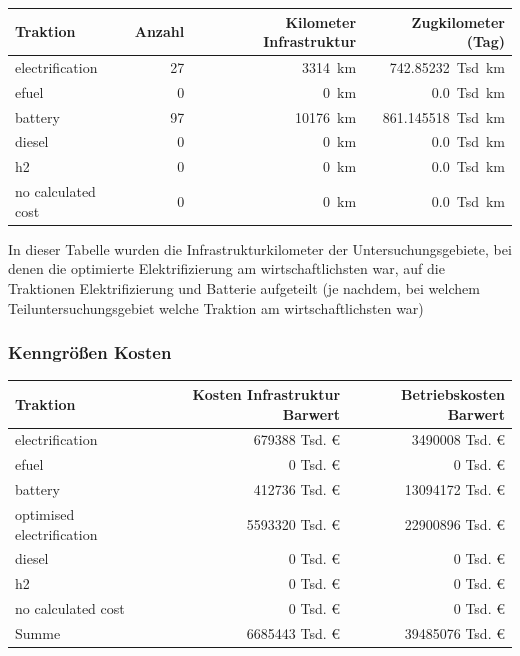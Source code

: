 \begin{center}
	\begin{tabularx}{\textwidth}{X | r | r | r} Traktion & Anzahl & Kilometer Infrastruktur & Zugkilometer (Tag) \\
	\hline
            electrification & \num{27} &  \SI{3314}{\km} & \SI{742.85232}{Tsd. \km}\\
            efuel & \num{0} &  \SI{0}{\km} & \SI{0.0}{Tsd. \km}\\
            battery & \num{97} &  \SI{10176}{\km} & \SI{861.145518}{Tsd. \km}\\
            diesel & \num{0} &  \SI{0}{\km} & \SI{0.0}{Tsd. \km}\\
            h2 & \num{0} &  \SI{0}{\km} & \SI{0.0}{Tsd. \km}\\
            no calculated cost & \num{0} &  \SI{0}{\km} & \SI{0.0}{Tsd. \km}\\
    	\end{tabularx}
\end{center}
In dieser Tabelle wurden die Infrastrukturkilometer der Untersuchungsgebiete, bei denen die optimierte Elektrifizierung am wirtschaftlichsten war, auf die Traktionen Elektrifizierung und Batterie aufgeteilt (je nachdem, bei welchem Teiluntersuchungsgebiet welche Traktion am wirtschaftlichsten war)

\subsubsection{Kenngrößen Kosten}

\begin{center}
	\begin{tabularx}{\textwidth}{X | r | r} Traktion & Kosten Infrastruktur Barwert & Betriebskosten Barwert\\
	\hline
            electrification & \num{679388} Tsd. € &  \num{3490008} Tsd. €\\
            efuel & \num{0} Tsd. € &  \num{0} Tsd. €\\
            battery & \num{412736} Tsd. € &  \num{13094172} Tsd. €\\
            optimised electrification & \num{5593320} Tsd. € &  \num{22900896} Tsd. €\\
            diesel & \num{0} Tsd. € &  \num{0} Tsd. €\\
            h2 & \num{0} Tsd. € &  \num{0} Tsd. €\\
            no calculated cost & \num{0} Tsd. € &  \num{0} Tsd. €\\
    	\hline
		Summe & \num{6685443} Tsd. € & \num{39485076} Tsd. €
	\end{tabularx}
\end{center}


